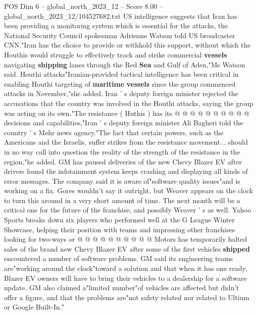 \begin{textsample}{POS Dim 6 – global\_north\_2023\_12 – Score 8.00 – global\_north\_2023\_12/104527682.txt}
US intelligence suggests that Iran has been providing a monitoring system which is essential for the attacks, the National Security Council spokesman Adrienne Watson told US broadcaster CNN."Iran has the choice to provide or withhold this support, without which the Houthis would struggle to effectively track and strike commercial \textbf{vessels} navigating \textbf{shipping} lanes through the Red \textbf{Sea} and Gulf of Aden,"Ms Watson said.
Houthi attacks"Iranian-provided tactical intelligence has been critical in enabling Houthi targeting of \textbf{maritime} \textbf{vessels} since the group commenced attacks in November,"she added.
Iran ' s deputy foreign minister rejected the accusations that the country was involved in the Houthi attacks, saying the group was acting on its own."The resistance ( Huthis ) has its @ @ @ @ @ @ @ @ @ @ decisions and capabilities,"Iran ' s deputy foreign minister Ali Bagheri told the country ' s Mehr news agency."The fact that certain powers, such as the Americans and the Israelis, suffer strikes from the resistance movement... should in no way call into question the reality of the strength of the resistance in the region,"he added.
GM has paused deliveries of the new Chevy Blazer EV after drivers found the infotainment system keeps crashing and displaying all kinds of error messages.
The company said it is aware of"software quality issues"and is working on a fix.
Gores wouldn't say it outright, but Weaver appears on the clock to turn this around in a very short amount of time.
The next month will be a critical one for the future of the franchise, and possibly Weaver ' s as well.
Yahoo Sports breaks down six players who performed well at the G League Winter Showcase, helping their position with teams and impressing other franchises looking for two-ways or @ @ @ @ @ @ @ @ @ @ Motors has temporarily halted sales of the brand new Chevy Blazer EV after some of the first vehicles \textbf{shipped} encountered a number of software problems.
GM said its engineering teams are"working around the clock"toward a solution and that when it has one ready, Blazer EV owners will have to bring their vehicles to a dealership for a software update.
GM also claimed a"limited number"of vehicles are affected but didn't offer a figure, and that the problems are"not safety related nor related to Ultium or Google Built-In."

\end{textsample}
